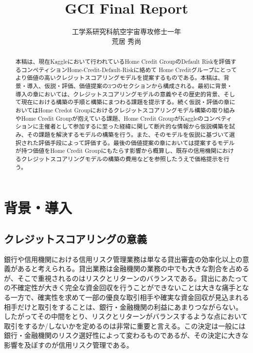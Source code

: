 \documentclass[11pt]{jsarticle}
\title{GCI Final Report}
\author{工学系研究科航空宇宙専攻修士一年\\荒居 秀尚}
\begin{document}
    
    
    \maketitle
    
    

    \begin{abstract}
本稿は、現在Kaggleにおいて行われているHome Credit GroupのDefault Riskを評価するコンペティションHome-Credit-Default-Riskに絡めて
Home Creditグループにとってより価値の高いクレジットスコアリングモデルを提案するものである。本稿は、背景・導入、仮説・評価、価値提案の3つのセクションから構成される。最初に背景・導入の章においては、クレジットスコアリングモデルの意義やその歴史的背景、そして現在における構築の手順と構築にまつわる課題を提示する。続く仮説・評価の章においてはHome Credot Groupにおけるクレジットスコアリングモデル構築の取り組みやHome Credit Groupが抱えている課題、Home Credit GroupがKaggleのコンペティションに主催者として参加するに至った経緯に関して断片的な情報から仮説構築を試み、その課題を解決するモデルの構築を行う。また、そのモデルを仮説に基づいて選択された評価手段によって評価する。最後の価値提案の章においては提案するモデルが持つ価値をHome Credit Groupにもたらす影響から概算し、既存の信用機関におけるクレジットスコアリングモデルの構築の費用などを参照したうえで価格提示を行う。
\end{abstract}
    \section{背景・導入}\label{ux80ccux666fux5c0eux5165}

\subsection{クレジットスコアリングの意義}\label{ux30afux30ecux30b8ux30c3ux30c8ux30b9ux30b3ux30a2ux30eaux30f3ux30b0ux306eux610fux7fa9}
銀行や信用機関における信用リスク管理業務は単なる貸出審査の効率化以上の意義があると考えられる。貸出業務は金融機関の業務の中でも大きな割合を占めるが、そこで重視されるのはリスクとリターンのバランスである。貸出にあたっての不確定性が大きく完全な資金回収を行うことができないことは大きな痛手となる一方で、確実性を求めて一部の優良な取引相手や確実な資金回収が見込まれる相手だけと取引をすることは、銀行・金融機関の利益にあまりつながらない。したがってその中間をとり、リスクとリターンがバランスするような点において取引をするか/しないかを定めるのは非常に重要と言える。この決定は一般には銀行・金融機関のリスク選好性によって変わるものであるが、その決定に大きな影響を及ぼすのが信用リスク管理である。\\
\end{document}
